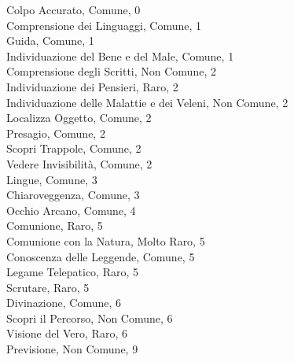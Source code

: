 \begin{multicols}{3}

Colpo Accurato, Comune, 0\\
Comprensione dei Linguaggi, Comune, 1\\
Guida, Comune, 1\\
Individuazione del Bene e del Male, Comune, 1\\
Comprensione degli Scritti, Non Comune, 2\\
Individuazione dei Pensieri, Raro, 2\\
Individuazione delle Malattie e dei Veleni, Non Comune, 2\\
Localizza Oggetto, Comune, 2\\
Presagio, Comune, 2\\
Scopri Trappole, Comune, 2\\
Vedere Invisibilità, Comune, 2\\
Lingue, Comune, 3\\
Chiaroveggenza, Comune, 3\\
Occhio Arcano, Comune, 4\\
Comunione, Raro, 5\\
Comunione con la Natura, Molto Raro, 5\\
Conoscenza delle Leggende, Comune, 5\\
Legame Telepatico, Raro, 5\\
Scrutare, Raro, 5\\
Divinazione, Comune, 6\\
Scopri il Percorso, Non Comune, 6\\
Visione del Vero, Raro, 6\\
Previsione, Non Comune, 9\\




\end{multicols}
